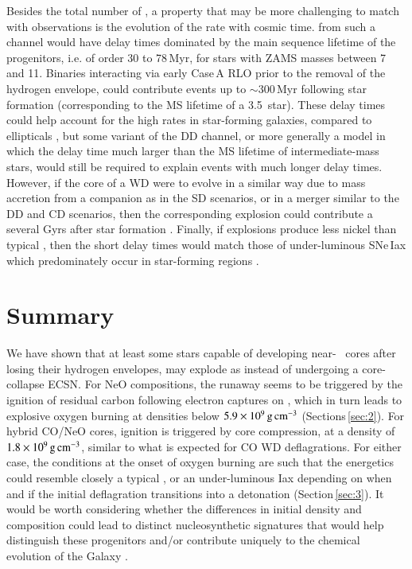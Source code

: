 \documentclass[twocolumn]{aa}
\begin{document}
Besides the total number of \ias, a property that may be more challenging to match with observations is the evolution of 
the \ia rate with cosmic time. \ias from such a channel would have delay times dominated by the main sequence lifetime of the progenitors, i.e. of order 30 to 78\,Myr, for stars with ZAMS masses between 7 and 11\msun. Binaries interacting via early Case\,A RLO prior to the removal of the hydrogen envelope, could contribute events up to $\sim 300$\,Myr following star formation (corresponding to the MS lifetime of a 3.5\msun\ star). 
These delay times could help account for the high \ia rates in star-forming galaxies, compared to ellipticals \citep{Maoz:2010pz,claeys2014}, but some variant of the DD channel, or more generally a model in which the delay time much larger than the MS lifetime of intermediate-mass stars, would still be required to explain events with much longer delay times.  
 However,  if the \one core of a WD  were to evolve in a similar way due to 
mass accretion from a companion as in the SD scenarios, or in a merger similar to the DD and CD scenarios, then the corresponding explosion could contribute a \ia several Gyrs after star formation  \citep[see also][and references therein]{Kashi:2011nm,chen2014b,Meng:2014qta,marquardt2015,Schwab:2015bma,Jones:2016asr,Schwab:2017epw,Schwab:2018cnb,kashyap2018,augustine2019,soker2019}. 
Finally, if \one explosions produce less nickel than typical \ias, then the short delay times would match those of under-luminous SNe\,Iax which predominately occur in star-forming regions \citep{Lyman:2013drq,Jha:2017gwq}. 


\section{Summary}\label{sec:5}
We have shown that at least some stars capable of developing near-\mch~ \one cores 
after losing their hydrogen  envelopes, may explode as \ias instead of 
undergoing a core-collapse  ECSN. For NeO compositions, the runaway seems to be triggered by the ignition of 
residual carbon following electron captures on , which in turn 
leads to explosive oxygen burning at densities below $5.9\times 10^{9}\mathrm{\,g\,cm^{-3}}$ (Sections\,\ref{sec:2}). 
For hybrid CO/NeO cores, ignition is triggered by core compression, at a density of $1.8\times10^{9}\mathrm{\,g\,cm^{-3}}$, similar to what is expected for CO WD deflagrations. For either case, the conditions at the onset of oxygen burning are such that the energetics  could resemble closely a typical \ia, or an under-luminous Iax depending on when and if the initial deflagration transitions into a detonation (Section\,\ref{sec:3}). 
It would be worth considering whether the differences in initial density and 
composition could lead to distinct nucleosynthetic signatures that would help 
distinguish these progenitors and/or contribute uniquely to the chemical 
evolution of the Galaxy \citep[in analogy to ][for ECSNe]{Jones:2018ule}.
\end{document}
